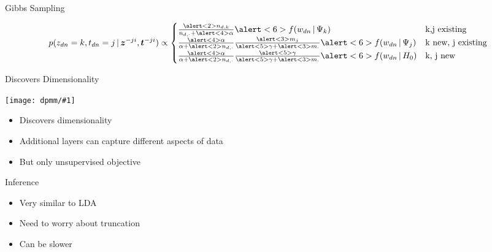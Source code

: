 \documentclass[compress]{beamer}
\newcommand{\gfx}[2]{
\begin{center}
	\texttt{[image: dpmm/\#1]}
\end{center}
}
\begin{document}
\begin{frame}{Gibbs Sampling}

    \begin{equation}
      p(z_{dn} = k, t_{dn} = j \g {\bm z^{-ji}}, {\bm t^{-ji}}) \propto \begin{cases}
\frac{\alert<2>{n_{d,k}}}{n_{d,\cdot} + \alert<4>{\alpha}} \alert<6>{f(w_{dn} \g \Psi_k)} & $k,j$
\mbox{ existing} \\
\frac{\alert<4>{\alpha}}{\alpha+\alert<2>{n_{d,\cdot}}}\frac{\alert<3>{ m_{j}}}{\alert<5>{\gamma} + \alert<3>{m_\cdot}} \alert<6>{f(w_{dn} \g \Psi_j)} & $k$
\mbox{ new, }$j$ \mbox{ existing} \\
\frac{\alert<4>{\alpha}}{\alpha+\alert<2>{n_{d,\cdot}}}
  \frac{\alert<5>{\gamma}}{\alert<5>{\gamma} + \alert<3>{m_\cdot}} \alert<6>{f(w_{dn} \g H_0)} & $k, j$ \mbox{ new}
\end{cases}
    \end{equation}

    \begin{center}
    \end{center}
\end{frame}

\begin{frame}{Discovers Dimensionality}

  \gfx{hdp-dimension}{.8}

  \begin{itemize}
    \item Discovers dimensionality
    \item Additional layers can capture different aspects of data
    \item But only unsupervised objective
  \end{itemize}

\end{frame}

\begin{frame}{Inference}

  \begin{itemize}
    \item Very similar to LDA
    \item Need to worry about truncation
    \item Can be slower
  \end{itemize}

\end{frame}
\end{document}
